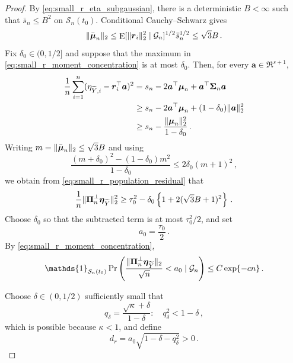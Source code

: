 \documentclass{article}
\makeatletter
\DeclareMathOperator{\expect}{E}
\theoremstyle{definition}
\newcommand{\vnorm}[1]{%
	\ensuremath{%
		\if@display
		\left\| #1 \right\|
		\else
		\| #1 \|
		\fi
	}%
}
\newcommand*{\bb}{\boldsymbol}
\def\bmu{\bb{\mu}}
\def\Ytil{\widetilde{Y}}
\def\bEtaYtil{\bb{\eta}_{\Ytil}}
\def\bSigma{\bb{\Sigma}}
\makeatother
\begin{document}
\begin{bibunit}
\begin{proof}
By \eqref{eq:small_r_eta_subgaussian}, there is a deterministic
$B<\infty$ such that $\bar s_n\leq B^2$ on
$\mathcal S_n(t_0)$. Conditional Cauchy--Schwarz gives
$$
	\vnorm{\bar{\bmu}_n}_2
	\leq
	\expect[
		\vnorm{\bb r_i}_2^2
		\mid
		\mathcal G_n
	]^{1/2}
	\bar s_n^{1/2}
	\leq
	\sqrt3B \,.
$$
Fix $\delta_0\in(0,1/2]$ and suppose that the maximum in
\eqref{eq:small_r_moment_concentration} is at most $\delta_0$. Then, for
every $\bb a\in\Re^{s+1}$,
$$
\begin{aligned}
	\frac1n\sum_{i=1}^n
	(\eta_{\Ytil,i}-\bb r_i^\top\bb a)^2
	&=
	s_n-2\bb a^\top\bmu_n+\bb a^\top\bSigma_n\bb a
	\\
	&\geq
	s_n-2\bb a^\top\bmu_n+(1-\delta_0)\vnorm{\bb a}_2^2
	\\
	&\geq
	s_n-
	\frac{\vnorm{\bmu_n}_2^2}{1-\delta_0}\,.
\end{aligned}
$$
Writing $m=\vnorm{\bar{\bmu}_n}_2\leq\sqrt3B$ and using
$$
	\frac{(m+\delta_0)^2-(1-\delta_0)m^2}{1-\delta_0}
	\leq
	2\delta_0(m+1)^2\,,
$$
we obtain from \eqref{eq:small_r_population_residual} that
$$
	\frac1n\vnorm{\bb\Pi_n^\perp\bEtaYtil}_2^2
	\geq
	\tau_0^2
	-
	\delta_0
	\left\{
		1+2(\sqrt3B+1)^2
	\right\}\,.
$$
Choose $\delta_0$ so that the subtracted term is at most
$\tau_0^2/2$, and set
$$
	a_0
	=
	\frac{\tau_0}{2}\,.
$$
By \eqref{eq:small_r_moment_concentration},
\begin{equation}
\label{eq:small_r_empirical_residual_probability}
	\mathds{1}_{\mathcal S_n(t_0)}
	\Pr\left(
		\frac{\vnorm{\bb\Pi_n^\perp\bEtaYtil}_2}{\sqrt n}
		<a_0
		\mid
		\mathcal G_n
	\right)
	\leq
	C\exp\{-cn\} \,.
\end{equation}

Choose $\delta\in(0,1/2)$ sufficiently small that
$$
	q_\delta
	=
	\frac{\sqrt\kappa+\delta}{1-\delta}: \quad 
	q_\delta^2<1-\delta \,,
$$
which is possible because $\kappa<1$, and define
\begin{equation}
\label{eq:small_r_gap_constant}
	d_r
	=
	a_0
	\sqrt{1-\delta-q_\delta^2}
	>
	0\,.
\end{equation}


\end{proof}
\end{bibunit}
\end{document}
